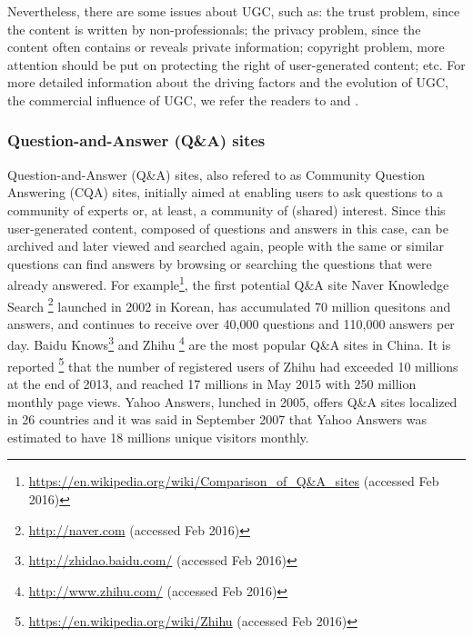 Nevertheless, there are some issues \cite{balasubramaniam2009user} about UGC, such as: the trust problem, since the content is written by non-professionals; the privacy problem, since the content often contains or reveals private information; copyright problem, more attention should be put on protecting the right of user-generated content; etc.
For more detailed information about the driving factors and the evolution of UGC, the commercial influence of UGC, we refer the readers to \cite{balasubramaniam2009user} and \cite{smith2012does}.

\subsubsection{Question-and-Answer (Q\&A) sites}

Question-and-Answer (Q\&A) sites, also refered to as Community Question Answering (CQA) sites, initially aimed at enabling users to ask questions to a community of experts or, at least, a community of (shared) interest. Since this user-generated content, composed of questions and answers in this case, can be archived and later viewed and searched again, people with the same or similar questions can find answers by browsing or searching the questions that were already answered. For example\footnote{\url{https://en.wikipedia.org/wiki/Comparison_of_Q\&A_sites} (accessed Feb 2016)},
the first potential Q\&A site Naver Knowledge Search \footnote{\url{http://naver.com} (accessed Feb 2016)} launched in 2002 in Korean, has accumulated 70 million quesitons and answers, and continues to receive over 40,000 questions and 110,000 answers per day\cite{sanghunnewyork}. Baidu Knows\footnote{\url{http://zhidao.baidu.com/} (accessed Feb 2016)} and Zhihu \footnote{\url{http://www.zhihu.com/} (accessed Feb 2016)} are the most popular Q\&A sites in China. It is reported \footnote{\url{https://en.wikipedia.org/wiki/Zhihu} (accessed Feb 2016)} that the number of registered users of Zhihu had exceeded 10 millions at the end of 2013, and reached 17 millions in May 2015 with 250 million monthly page views. Yahoo Answers, lunched in 2005, offers Q\&A sites localized in 26 countries and it was said in September 2007\cite{Harper:2008:PAQ:1357054.1357191} that Yahoo Answers was estimated to have 18 millions unique visitors monthly.


